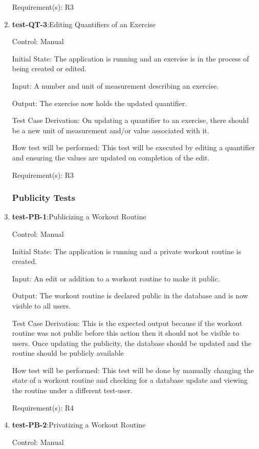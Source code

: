\documentclass[12pt, titlepage]{article}
\begin{document}
\begin{enumerate}
		Requirement(s): R3
		\item{\textbf{test-QT-3}}:Editing Quantifiers of an Exercise
		
		Control: Manual
		
		Initial State: The application is running and an exercise is in the process of being created or edited.
		
		Input: A number and unit of measurement describing an exercise.
		
		Output: The exercise now holds the updated quantifier.
		
		Test Case Derivation: On updating a quantifier to an exercise, there should be a new unit of measurement and/or value associated with it.
		
		How test will be performed: This test will be executed by editing a quantifier and ensuring the values are updated on completion of the edit.
		
		Requirement(s): R3
		
		\subsubsection{Publicity Tests}
		\item{\textbf{test-PB-1}}:Publicizing a Workout Routine
		
		Control: Manual
		
		Initial State: The application is running and a private workout routine is created.
		
		Input: An edit or addition to a workout routine to make it public.
		
		Output: The workout routine is declared public in the database and is now visible to all users.
		
		Test Case Derivation: This is the expected output because if the workout routine was not public before this action then it should not be visible to users. Once updating the publicity, the database should be updated and the routine should be publicly available 
		
		How test will be performed: This test will be done by manually changing the state of a workout routine and checking for a database update and viewing the routine under a different test-user.
		
		Requirement(s): R4
		
		\item{\textbf{test-PB-2}}:Privatizing a Workout Routine
		
		Control: Manual
		

\end{enumerate}
\end{document}
